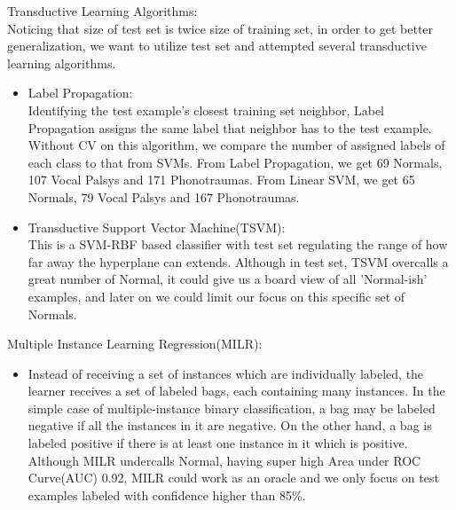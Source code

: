 Transductive Learning Algorithms:\newline\\
\indent Noticing that size of test set is twice size of training set, in order to get better generalization, we want to utilize test set and attempted several transductive learning algorithms. \\
\begin{itemize}
	\item Label Propagation:\\
	Identifying the test example's closest training set neighbor, Label Propagation assigns the same label that neighbor has to the test example. Without CV on this algorithm, we compare the number of assigned labels of each class to that from SVMs. From Label Propagation, we get 69 Normals, 107 Vocal Palsys and 171 Phonotraumas. From Linear SVM, we get 65 Normals, 79 Vocal Palsys and 167 Phonotraumas.\\
	\item Transductive Support Vector Machine(TSVM):\\
	This is a SVM-RBF based classifier with test set regulating the range of how far away the hyperplane can extends. Although in test set, TSVM overcalls a great number of Normal, it could give us a board view of all 'Normal-ish' examples, and later on we could limit our focus on this specific set of Normals. \\
\end{itemize}

Multiple Instance Learning Regression(MILR):\\
\begin{itemize}
	\item 
	Instead of receiving a set of instances which are individually labeled, the learner receives a set of labeled bags, each containing many instances. In the simple case of multiple-instance binary classification, a bag may be labeled negative if all the instances in it are negative. On the other hand, a bag is labeled positive if there is at least one instance in it which is positive. \cite{b10} Although MILR undercalls Normal, having super high Area under ROC Curve(AUC) 0.92, MILR could work as an oracle and we only focus on test examples labeled with confidence higher than 85\%.\\
\end{itemize}
